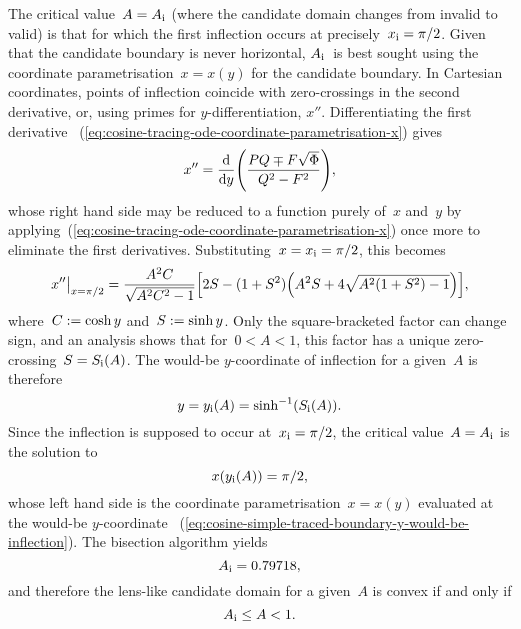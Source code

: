 The critical value~$A = A_{\mathrm{i}}$
(where the candidate domain changes from invalid to valid)
is that for which the first inflection occurs at precisely~$x_{\mathrm{i}} = \pi/2$.
Given that the candidate boundary is never horizontal,
$A_{\mathrm{i}}$~is best sought using the coordinate parametrisation~$x = x (y)$
for the candidate boundary.
In Cartesian coordinates, points of inflection coincide with
zero-crossings in the second derivative,
or, using primes for $y$-differentiation, $x''$.
Differentiating the first derivative~%
  (\ref{eq:cosine-tracing-ode-coordinate-parametrisation-x})
gives
\begin{equation}
  x'' = \tder{}{y} \roundbr*{\frac{P Q \mp F \sqrt{\Phi}}{Q^2 - F^2}},
  \label{eq:acceleration-traced-boundary-cartesian-by-y}
\end{equation}
whose right hand side may be reduced to a function purely of~$x$ and~$y$
by applying~(\ref{eq:cosine-tracing-ode-coordinate-parametrisation-x})
once more to eliminate the first derivatives.
Substituting~$x = x_{\mathrm{i}} = \pi/2$, this becomes
\begin{equation}
  \eval[\big]{x''}_{x=\pi/2} =
    \frac{A^2 C}{\sqrt{A^2 C^2 - 1}}
    \squarebr*{
      2 S - (1 + S^2) \roundbr*{A^2 S + 4 \sqrt{A^2 (1 + S^2) - 1}}
    },
  \label{eq:%
    cosine-simple-traced-boundary-acceleration-cartesian-by-y-inflection%
  }
\end{equation}
where~$C := \cosh y$ and~$S := \sinh y$.
Only the square-bracketed factor can change sign,
and an analysis shows that for~$0 < A < 1$,
this factor has a unique zero-crossing~$S = S_{\mathrm{i}} (A)$.
The would-be $y$-coordinate of inflection for a given~$A$ is therefore
\begin{equation}
  y = y_{\mathrm{i}} (A) = \sinh^{-1} (S_{\mathrm{i}} (A)).
  \label{eq:cosine-simple-traced-boundary-y-would-be-inflection}
\end{equation}
Since the inflection is supposed to occur at~$x_{\mathrm{i}} = \pi/2$,
the critical value~$A = A_{\mathrm{i}}$ is the solution to
\begin{equation}
  x (y_{\mathrm{i}} (A)) = \pi/2,
  \label{eq:cosine-simple-traced-boundary-a-inflection-equation}
\end{equation}
whose left hand side is the coordinate parametrisation~$x = x (y)$
evaluated at the would-be $y$-coordinate~%
  (\ref{eq:cosine-simple-traced-boundary-y-would-be-inflection}).
The bisection algorithm yields
\begin{equation}
  A_{\mathrm{i}} = 0.79718,
  \label{eq:cosine-simple-traced-boundary-a-inflection}
\end{equation}
and therefore the lens-like candidate domain for a given~$A$ is convex
if and only if
\begin{equation}
  A_{\mathrm{i}} \le A < 1.
  \label{eq:cosine-simple-traced-boundary-convex-a-interval}
\end{equation}


